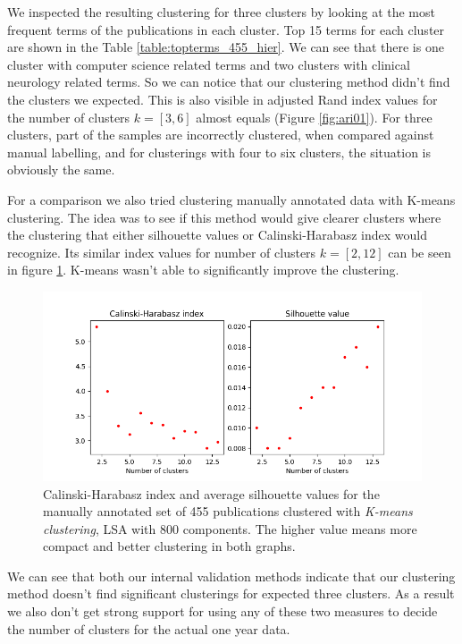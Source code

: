 We inspected the resulting clustering for three clusters by 
looking at the most frequent terms of the publications in each 
cluster. Top 15 terms for each cluster are shown in the Table 
\ref{table:topterms_455_hier}. We can see that there is one cluster
with computer science related terms and two clusters with clinical
neurology related terms. So we can notice that our clustering method
didn't find the clusters we expected. This is also visible in 
adjusted Rand index values for the number of clusters $k=[3,6]$ almost 
equals (Figure \ref{fig:ari01}). For three clusters, part of the 
samples are incorrectly clustered, when compared against manual
labelling, and for clusterings with four to six clusters, the 
situation is obviously the same.



For a comparison we also tried clustering manually annotated data
with K-means clustering. The idea was to see if this method would
give clearer clusters where the clustering that either silhouette values or 
Calinski-Harabasz index would recognize. Its similar
index values for number of clusters $k=[2,12]$ can be seen in 
figure \ref{fig:ch-silh02}. K-means wasn't able to significantly 
improve the clustering.

\begin{figure}[htp]
  \begin{center}    
\includegraphics[width=11.5cm]{images/c-h-silh-index-plot-455-2_12-800-kmeans.png}
    \caption{Calinski-Harabasz index and average silhouette values for the
    manually annotated set of 455 publications clustered with 
    \emph{K-means clustering}, LSA with 800 components. The higher
    value means more compact and better clustering in both graphs.}
    \label{fig:ch-silh02}
  \end{center}
\end{figure}

We can see that both our internal validation methods indicate that
our clustering method doesn't find significant clusterings for
expected three clusters.
As a result we also don't get strong support for using any of 
these two measures to decide the number of clusters for the actual 
one year data.


